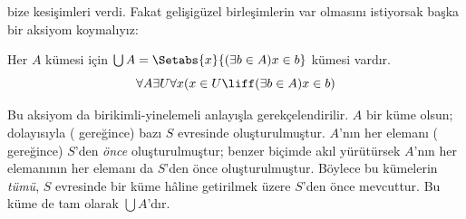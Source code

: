 


 bize kesişimleri verdi.
Fakat gelişigüzel birleşimlerin var olmasını istiyorsak başka bir aksiyom
koymalıyız:

\begin{axiom}[Birleşim] Her $A$ kümesi için
$\bigcup A=\Setabs{x}{(\exists b\in A)x\in b}$ kümesi vardır.
\[
  \forall A \exists U \forall x(x \in U \liff (\exists b \in A)x \in b)
\]
\end{axiom}

Bu aksiyom da birikimli-yinelemeli anlayışla gerekçelendirilir. $A$ bir küme
olsun; dolayısıyla (\stageshier{} gereğince) bazı $S$ evresinde
oluşturulmuştur. $A$'nın her elemanı (\stagesacc{} gereğince) $S$'den
\emph{önce} oluşturulmuştur; benzer biçimde akıl yürütürsek $A$'nın her
elemanının her elemanı da $S$'den önce oluşturulmuştur. Böylece bu kümelerin
\emph{tümü}, $S$ evresinde bir küme hâline getirilmek üzere $S$'den önce
mevcuttur. Bu küme de tam olarak $\bigcup A$'dır.

